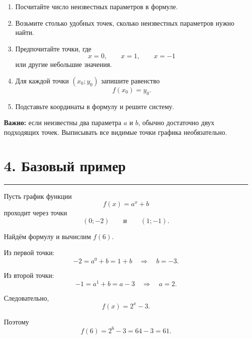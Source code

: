 \documentclass[a4paper,12pt]{article}
\newcommand{\sectionline}{%
  \vspace{-0.2em}
  \textcolor{accent}{\rule{\linewidth}{0.5pt}}
  \vspace{0.25em}
}
\newcommand{\key}[1]{\textbf{\textcolor{darkaccent}{#1}}}
\begin{document}
\begin{enumerate}

  \item
  Посчитайте число неизвестных параметров в формуле.

  \item
  Возьмите столько удобных точек,
  сколько неизвестных параметров нужно найти.

  \item
  Предпочитайте точки, где
  \[
      x=0,\qquad x=1,\qquad x=-1
  \]
  или другие небольшие значения.

  \item
  Для каждой точки $(x_0;y_0)$ запишите равенство
  \[
      f(x_0)=y_0.
  \]

  \item
  Подставьте координаты в формулу и решите систему.

\end{enumerate}

\key{Важно:}
если неизвестны два параметра $a$ и $b$,
обычно достаточно двух подходящих точек.
Выписывать все видимые точки графика необязательно.


\section*{4. Базовый пример}
\sectionline

Пусть график функции
\[
    f(x)=a^x+b
\]
проходит через точки
\[
    (0;-2)
    \qquad\text{и}\qquad
    (1;-1).
\]

Найдём формулу и вычислим $f(6)$.

Из первой точки:
\[
-2=a^0+b=1+b
\quad\Longrightarrow\quad
b=-3.
\]

Из второй точки:
\[
-1=a^1+b=a-3
\quad\Longrightarrow\quad
a=2.
\]

Следовательно,
\[
    f(x)=2^x-3.
\]

Поэтому
\[
    f(6)=2^6-3=64-3=61.
\]
\end{document}
